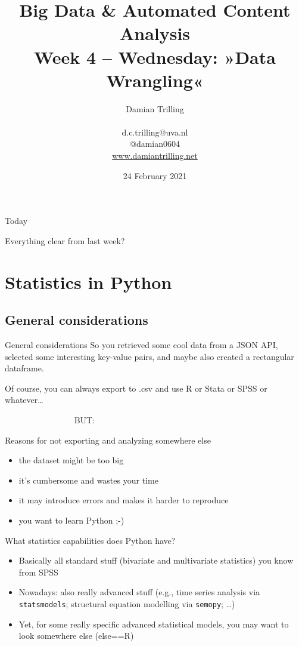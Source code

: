 \documentclass[compress]{beamer}
\title[Big Data and Automated Content Analysis]{\textbf{Big Data \& Automated Content Analysis} \\ Week 4 -- Wednesday: »Data Wrangling«}
\author[Damian Trilling]{Damian Trilling \\ ~ \\ \footnotesize{d.c.trilling@uva.nl \\@damian0604} \\ \url{www.damiantrilling.net}}
\date{24 February 2021}
\institute[UvA]{Afdeling Communicatiewetenschap \\Universiteit van Amsterdam}
\begin{document}
\begin{frame}{}
	\titlepage
\end{frame}

\begin{frame}{Today}
	\tableofcontents
\end{frame}


\begin{frame}[standout]
	Everything clear from last week?
\end{frame}




\section{Statistics in Python}
\subsection{General considerations}


\begin{frame}{General considerations}
So you retrieved some cool data from a JSON API, selected some interesting key-value pairs, and maybe also created a rectangular dataframe.

Of course, you can always export to .csv and use R or Stata or SPSS or whatever\ldots

\vspace{1cm}
\pause

~~~~~~~~~~~~~~~~ \Huge{BUT:}
\end{frame}


\begin{frame}{Reasons for not exporting and analyzing somewhere else}
\begin{itemize}
	\item the dataset might be too big
	\item it's cumbersome and wastes your time
	\item it may introduce errors and makes it harder to reproduce
	\item you want to learn Python ;-)
\end{itemize}
\end{frame}


\begin{frame}{What statistics capabilities does Python have?}
	
\begin{itemize}
	\item Basically all standard stuff (bivariate and multivariate statistics) you know from SPSS
	\item Nowadays: also  really advanced stuff (e.g., time series analysis via \texttt{statsmodels}; structural equation modelling via \texttt{semopy}; \ldots)
	\item Yet, for some really specific advanced statistical models, you may want to look somewhere else (else==R)
	
\end{itemize}
\end{frame}
\end{document}
